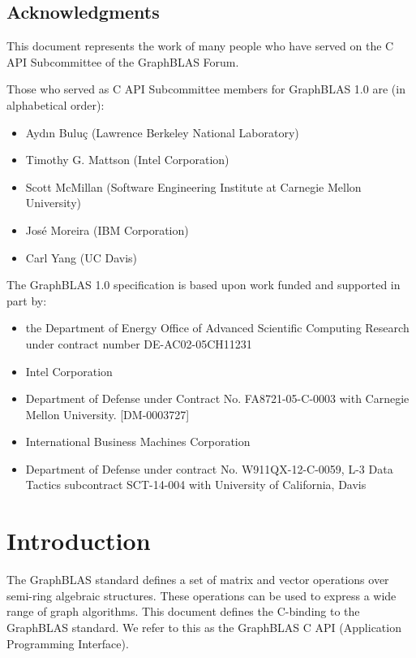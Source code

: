 \documentclass[11pt]{extbook}
\begin{document}
\section*{Acknowledgments}

This document represents the work of many people who have served on the C API
Subcommittee of the GraphBLAS Forum.

Those who served as C API Subcommittee members for GraphBLAS 1.0 are (in alphabetical order):
\begin{itemize}
\item Ayd\i n Bulu\c{c} (Lawrence Berkeley National Laboratory)
\item Timothy G. Mattson (Intel Corporation)
\item Scott McMillan (Software Engineering Institute at Carnegie Mellon University)
\item Jos\'e Moreira (IBM Corporation)
\item Carl Yang (UC Davis)
\end{itemize}


The GraphBLAS 1.0 specification is based upon work funded and supported in part by:
\begin{itemize}
\item the Department of Energy Office of Advanced Scientific Computing Research under contract number DE-AC02-05CH11231
\item Intel Corporation
\item Department of Defense under Contract No. FA8721-05-C-0003 with Carnegie Mellon University. [DM-0003727]
\item International Business Machines Corporation
\item Department of Defense under contract No. W911QX-12-C-0059, L-3 Data Tactics subcontract SCT-14-004 with University of California, Davis
\end{itemize}
\vfill
\pagebreak




\chapter{Introduction}

The GraphBLAS standard defines a set of matrix and vector operations 
over semi-ring algebraic structures.  These operations can be used
to express a wide range of graph algorithms.   This document 
defines the C-binding to the GraphBLAS standard.   We refer to 
this as the GraphBLAS C API (Application Programming Interface).   
\end{document}
